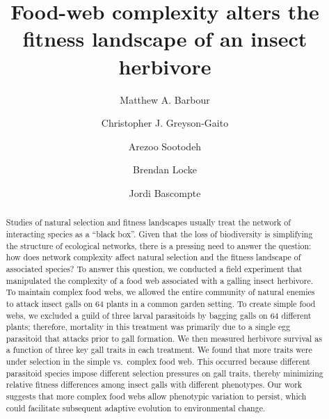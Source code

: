 \documentclass[]{elsarticle} %
\begin{document}
\begin{frontmatter}

  \title{Food-web complexity alters the fitness landscape of an insect herbivore}
    \author[a,b]{Matthew A. Barbour}
    \author[a,c]{Christopher J. Greyson-Gaito}
  
  
    \author[a]{Arezoo Sootodeh}
  
  
    \author[d]{Brendan Locke}
  
  
    \author[b]{Jordi Bascompte}
  
  
      \address[a]{University of British Columbia, Department of Zoology, 6270 University
Blvd., Vancouver, BC, V6T 1Z4, Canada}
    \address[b]{University of Zurich, Department of Evolutionary Biology and
Environmental Studies, Winterthurerstrasse 190, Zurich, 8057,
Switzerland}
    \address[c]{University of Guelph, Department of Integrative Biology, 50 Stone Rd.
East, Guelph, ONT, N1G 2W1, Canada}
    \address[d]{Humboldt State University, Department of Biological Sciences, 1 Harpst
St., Arcata, CA, 95521, USA}
  
  \begin{abstract}
  Studies of natural selection and fitness landscapes usually treat the
  network of interacting species as a ``black box''. Given that the loss
  of biodiversity is simplifying the structure of ecological networks,
  there is a pressing need to answer the question: how does network
  complexity affect natural selection and the fitness landscape of
  associated species? To answer this question, we conducted a field
  experiment that manipulated the complexity of a food web associated with
  a galling insect herbivore. To maintain complex food webs, we allowed
  the entire community of natural enemies to attack insect galls on 64
  plants in a common garden setting. To create simple food webs, we
  excluded a guild of three larval parasitoids by bagging galls on 64
  different plants; therefore, mortality in this treatment was primarily
  due to a single egg parasitoid that attacks prior to gall formation. We
  then measured herbivore survival as a function of three key gall traits
  in each treatment. We found that more traits were under selection in the
  simple vs.~complex food web. This occurred because different parasitoid
  species impose different selection pressures on gall traits, thereby
  minimizing relative fitness differences among insect galls with
  different phenotypes. Our work suggests that more complex food webs
  allow phenotypic variation to persist, which could facilitate subsequent
  adaptive evolution to environmental change.
  \end{abstract}
  
 \end{frontmatter}
\end{document}
